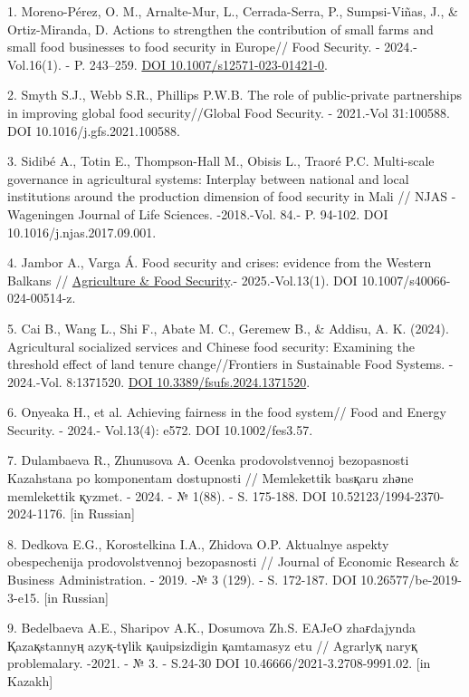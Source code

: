\begin{refs}
1. Moreno-Pérez, O. M., Arnalte-Mur, L., Cerrada-Serra, P.,
Sumpsi-Viñas, J., \& Ortiz-Miranda, D. Actions to strengthen the
contribution of small farms and small food businesses to food security
in Europe// Food Security. - 2024.- Vol.16(1). - P. 243--259.
\href{https://doi.org/10.1007/s12571-023-01421-0}{DOI
10.1007/s12571-023-01421-0}.

2. Smyth S.J., Webb S.R., Phillips P.W.B. The role of public-private
partnerships in improving global food security//Global Food Security. -
2021.-Vol 31:100588. DOI 10.1016/j.gfs.2021.100588.

3. Sidibé A., Totin E., Thompson-Hall M., Obisis L., Traoré P.C.
Multi-scale governance in agricultural systems: Interplay between
national and local institutions around the production dimension of food
security in Mali // NJAS - Wageningen Journal of Life Sciences.
-2018.-Vol. 84.- P. 94-102. DOI 10.1016/j.njas.2017.09.001.

4. Jambor A., Varga Á. Food security and crises: evidence from the
Western Balkans //
\href{https://www.researchgate.net/journal/Agriculture-Food-Security-2048-7010?_tp=eyJjb250ZXh0Ijp7ImZpcnN0UGFnZSI6InB1YmxpY2F0aW9uIiwicGFnZSI6InB1YmxpY2F0aW9uIn19}{Agriculture
\& Food Security}.- 2025.-Vol.13(1). DOI 10.1007/s40066-024-00514-z.

5. Cai B., Wang L., Shi F., Abate M. C., Geremew B., \& Addisu, A. K.
(2024). Agricultural socialized services and Chinese food security:
Examining the threshold effect of land tenure change//Frontiers in
Sustainable Food Systems. - 2024.-Vol. 8:1371520.
\href{https://doi.org/10.3389/fsufs.2024.1371520}{DOI
10.3389/fsufs.2024.1371520}.

6. Onyeaka H., et al. Achieving fairness in the food system// Food and
Energy Security. - 2024.- Vol.13(4): e572. DOI 10.1002/fes3.57.

7. Dulambaeva R., Zhunusova A. Ocenka prodovol\textquotesingle stvennoj
bezopasnosti Kazahstana po komponentam dostupnosti // Memlekettіk
basқaru zhәne memlekettіk қyzmet. - 2024. - № 1(88). - S. 175-188. DOI
10.52123/1994-2370-2024-1176. {[}in Russian{]}

8. Dedkova E.G., Korostelkina I.A., Zhidova O.P.
Aktual\textquotesingle nye aspekty obespechenija
prodovol\textquotesingle stvennoj bezopasnosti // Journal of Economic
Research \& Business Administration. - 2019. -№ 3 (129). - S. 172-187.
DOI 10.26577/be-2019-3-e15. {[}in Russian{]}

9. Bedelbaeva A.E., Sharipov A.K., Dosumova Zh.S. EAJeO zhaғdajynda
Қazaқstannyң azyқ-tүlіk қauіpsіzdіgіn қamtamasyz etu // Agrarlyқ naryқ
problemalary. -2021. - № 3. - S.24-30
DOI 10.46666/2021-3.2708-9991.02. {[}in Kazakh{]}


\end{refs}

